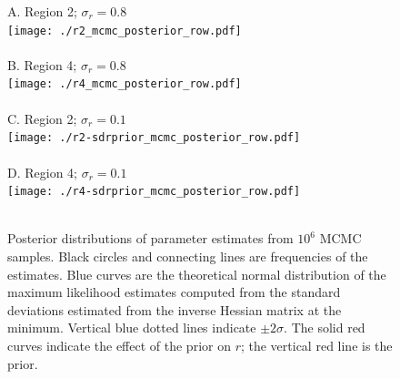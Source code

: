 \documentclass[12pt,letterpaper]{article}
\begin{document}
\begin{figure}
\begin{center}
{\sffamily
A. Region 2; $\sigma_r=0.8$\\
\texttt{[image: ./r2\_mcmc\_posterior\_row.pdf]}\\
~\\
B. Region 4; $\sigma_r=0.8$\\
\texttt{[image: ./r4\_mcmc\_posterior\_row.pdf]}\\
~\\
C. Region 2; $\sigma_r=0.1$\\
\texttt{[image: ./r2-sdrprior\_mcmc\_posterior\_row.pdf]}\\
~\\
D. Region 4; $\sigma_r=0.1$\\
\texttt{[image: ./r4-sdrprior\_mcmc\_posterior\_row.pdf]}\\
~\\
}
\end{center}
\caption{Posterior distributions of parameter estimates from $10^6$
MCMC samples. 
Black circles and connecting lines are frequencies of the estimates.
Blue curves are the theoretical normal distribution of the maximum
likelihood estimates computed from the standard deviations estimated
from the inverse Hessian matrix at the minimum. 
Vertical blue dotted lines indicate $\pm 2\sigma$.
The solid red curves indicate the effect of the prior on $r$; the
vertical red line is the prior.
\label{fig:posteriors}}
\end{figure}
\end{document}
